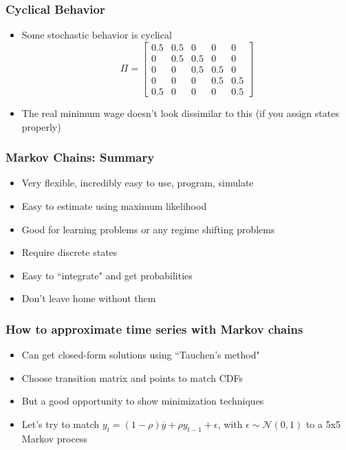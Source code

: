 \documentclass{beamer}
\begin{document}
\begin{frame}
\frametitle[alignment=center]{Cyclical Behavior}
\begin{itemize}
\item Some stochastic behavior is cyclical
$$\Pi=\left[\begin{array}{ccccc}0.5 & 0.5 & 0 & 0 & 0\\ 0 & 0.5 & 0.5 & 0 & 0 \\ 0 & 0 & 0.5 & 0.5 & 0 \\ 0 & 0 & 0 & 0.5 & 0.5 \\ 0.5 & 0 & 0 & 0 & 0.5\end{array}\right]$$
\item The real minimum wage doesn't look dissimilar to this (if you assign states properly)
\end{itemize}
\end{frame}


\begin{frame}
\frametitle[alignment=center]{Markov Chains: Summary}
\begin{itemize}
\item Very flexible, incredibly easy to use, program, simulate
\bigskip
\item Easy to estimate using maximum likelihood
\bigskip
\item Good for learning problems or any regime shifting problems
\bigskip
\item Require discrete states
\bigskip
\item Easy to ``integrate" and get probabilities
\bigskip
\item Don't leave home without them
\end{itemize}
\end{frame}

\begin{frame}
\frametitle[alignment=center]{How to approximate time series with Markov chains}
\begin{itemize}
\item Can get closed-form solutions using ``Tauchen's method"
\bigskip
\item Choose transition matrix and points to match CDFs
\bigskip
\item But a good opportunity to show minimization techniques
\bigskip
\item Let's try to match $y_t=(1-\rho)\overline{y}+\rho y_{t-1}+\epsilon$, with $\epsilon\sim\mathcal{N}(0,1)$ to a 5x5 Markov process
\end{itemize}
\end{frame}
\end{document}
